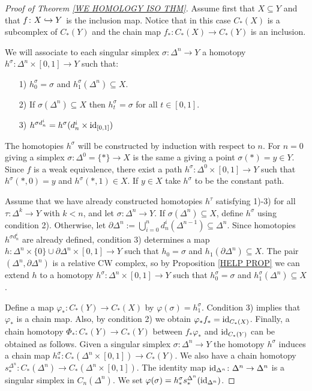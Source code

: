 \begin{proof}[Proof of Theorem \ref{WE HOMOLOGY ISO THM}]
Assume first that $X \subseteq Y$ and that $f\colon X\hookrightarrow Y$ is the inclusion map.
Notice that in this case $C_{\ast}(X)$ is a subcomplex of $C_{\ast}(Y)$ and 
the chain map $f_{\ast}\colon C_{\ast}(X) \to C_{\ast}(Y)$ is an inclusion. 

We will associate to each singular simplex $\sigma\colon \Delta^{n}\to Y$ a 
homotopy $h^{\sigma}\colon \Delta^{n} \times [0, 1] \to Y$ such that:
\begin{itemize}
\item[1)] $h^{\sigma}_{0} = \sigma$ and $h^{\sigma}_{1}(\Delta^{n})\subseteq X$.
\item[2)] If $\sigma(\Delta^{n})\subseteq X$ then $h^{\sigma}_{t} = \sigma$ for 
all $t\in [0, 1]$.
\item[3)] $h^{\sigma d^{i}_{n}} = h^{\sigma}(d^{i}_{n}\times \mathrm{id}_{[0, 1]})$
\end{itemize}
The homotopies $h^{\sigma}$ will be constructed by induction with respect to $n$.
For $n=0$ giving a simplex $\sigma\colon \Delta^{0} = \{\ast\} \to X$ 
is the same a giving a point $\sigma(\ast) = y\in Y$. 
Since $f$ is a weak equivalence, there exist a path 
$h^{\sigma}\colon \Delta^{0}\times [0, 1]\to Y$ such that $h^{\sigma}(\ast, 0) = y$
and $h^{\sigma}(\ast, 1)\in X$. If $y\in X$ take $h^{\sigma}$ to be the constant path. 

Assume that we have already constructed homotopies $h^{\tau}$ satisfying 1)-3) for 
all $\tau\colon \Delta^{k}\to Y$ with $k < n$, and let $\sigma\colon \Delta^{n}\to Y$. 
If $\sigma(\Delta^{n})\subseteq X$, define $h^{\sigma}$ using condition 2). 
Otherwise, let 
$\partial \Delta^{n} := \bigcup_{i=0}^{n}d^{i}_{n}(\Delta^{n-1})\subseteq \Delta^{n}$. 
Since homotopies $h^{\sigma d^{i}_{n}}$ are already defined, condition 3) determines
a map $h\colon \Delta^{n}\times \{0\} \cup \partial\Delta^{n}\times [0, 1]\to Y$ such that 
$h_{0} = \sigma$ and $h_{1}(\partial\Delta^{n})\subseteq X$.  
The pair $(\Delta^{n}, \partial \Delta^{n})$ is a relative CW complex, so by 
Proposition \ref{HELP PROP} we can extend $h$ to a homotopy 
$h^{\sigma}\colon \Delta^{n}\times [0, 1] \to Y$ such that 
$h^{\sigma}_{0} = \sigma$ and $h^{\sigma}_{1}(\Delta^{n}) \subseteq X$. 

Define a map $\varphi_{\ast}\colon C_{\ast}(Y) \to C_{\ast}(X)$ by 
$\varphi(\sigma) = h_{1}^{\sigma}$. Condition 3) implies that $\varphi_{\ast}$ is 
a chain map. Also, by condition 2) we obtain $\varphi_{\ast}f_{\ast} = \mathrm{id}_{C_{\ast}(X)}$.
Finally, a chain homotopy $\Phi_{\ast}\colon C_{\ast}(Y)\to C_{\ast}(Y)$ 
between $f_{\ast}\varphi_{\ast}$ and $\mathrm{id}_{C_{\ast}(Y)}$ can be obtained as follows.
Given a singular simplex $\sigma\colon \Delta^{n}\to Y$ the homotopy 
$h^{\sigma}$ induces a chain map 
$h^{\sigma}_{\ast}\colon C_{\ast}(\Delta^{n}\times [0, 1]) \to C_{\ast}(Y)$. 
We also have a chain homotopy 
$s^{\Delta^{n}}_{\ast}\colon C_{\ast}(\Delta^{n}) \to C_{\ast}(\Delta^{n}\times [0, 1])$. 
The identity map $\mathrm{id}_{\Delta^{n}}\colon \Delta^{n}\to \Delta^{n}$ is a singular 
simplex in $C_{n}(\Delta^{n})$. We set 
$\varphi(\sigma) = h^{\sigma}_{\ast}s^{\Delta^{n}}_{\ast}(\mathrm{id}_{\Delta^{n}})$.



\end{proof}
